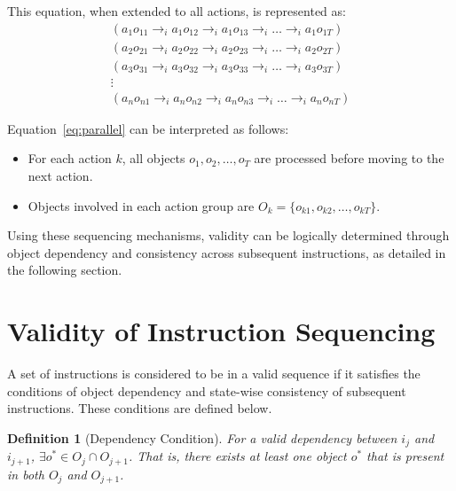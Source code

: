 \documentclass[a4paper,11pt]{lmcs}
\newtheorem{definition}{Definition}
\begin{document}
This equation, when extended to all actions, is represented as:
\begin{eqnarray}
\label{eq:parallel}
(a_1 o_{11} \rightarrow_i a_1 o_{12} \rightarrow_i a_1 o_{13} \rightarrow_i \ldots \rightarrow_i a_1 o_{1T}) \\
(a_2 o_{21} \rightarrow_i a_2 o_{22} \rightarrow_i a_2 o_{23} \rightarrow_i \ldots \rightarrow_i a_2 o_{2T}) \nonumber \\
(a_3 o_{31} \rightarrow_i a_3 o_{32} \rightarrow_i a_3 o_{33} \rightarrow_i \ldots \rightarrow_i a_3 o_{3T}) \nonumber \\
\vdots \nonumber \\
(a_n o_{n1} \rightarrow_i a_n o_{n2} \rightarrow_i a_n o_{n3} \rightarrow_i \ldots \rightarrow_i a_n o_{nT}) \nonumber
\end{eqnarray}

Equation~\ref{eq:parallel} can be interpreted as follows:
\begin{itemize}
    \item For each action \(k\), all objects \(o_1, o_2, \ldots, o_T\) are processed before moving to the next action.
    \item Objects involved in each action group are \(O_k = \{o_{k1}, o_{k2}, \ldots, o_{kT}\}\).
\end{itemize}

Using these sequencing mechanisms, validity can be logically determined through object dependency and consistency across subsequent instructions, as detailed in the following section.

\section{Validity of Instruction Sequencing}
\label{sec:validity}
A set of instructions is considered to be in a valid sequence if it satisfies the conditions of object dependency and state-wise consistency of subsequent instructions. These conditions are defined below.

\begin{definition}[Dependency Condition]
For a valid dependency between \(i_j\) and \(i_{j+1}\), \(\exists o^* \in O_j \cap O_{j+1}\). That is, there exists at least one object \(o^*\) that is present in both \(O_j\) and \(O_{j+1}\).
\end{definition}
\end{document}
